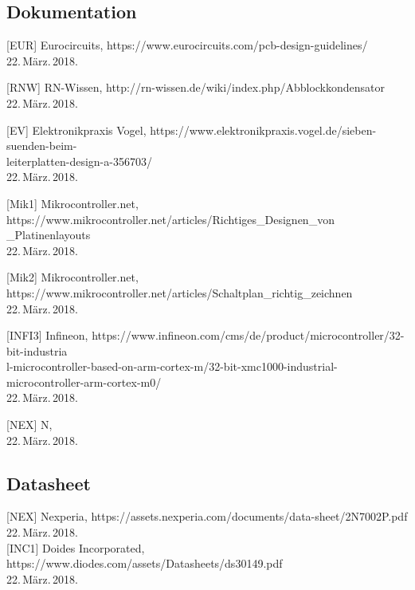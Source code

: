 \subsection{Dokumentation}

{ {[EUR] {Eurocircuits}}, {https://www.eurocircuits.com/pcb-design-guidelines/ }
\\ {22.\,März.\,2018}.\\

{ {[RNW] {RN-Wissen}}, {http://rn-wissen.de/wiki/index.php/Abblockkondensator }
\\ {22.\,März.\,2018}.\\

{ {[EV] {Elektronikpraxis Vogel}}, {https://www.elektronikpraxis.vogel.de/sieben-suenden-beim-\\leiterplatten-design-a-356703/ }
\\ {22.\,März.\,2018}.\\

{ {[Mik1] {Mikrocontroller.net}}, { https://www.mikrocontroller.net/articles/Richtiges\_Designen\_von\\
\_Platinenlayouts }
\\ {22.\,März.\,2018}.\\

{ {[Mik2] {Mikrocontroller.net}}, {https://www.mikrocontroller.net/articles/Schaltplan\_richtig\_zeichnen }
\\ {22.\,März.\,2018}.\\

{ {[INFI3] {Infineon}}, {https://www.infineon.com/cms/de/product/microcontroller/32-bit-industria\\
l-microcontroller-based-on-arm-cortex-m/32-bit-xmc1000-industrial-microcontroller-arm-cortex-m0/   }
\\ {22.\,März.\,2018}.\\

{ {[NEX] {N}}, {   }
\\ {22.\,März.\,2018}.\\

\subsection{Datasheet}

{ {[NEX] {Nexperia}}, {https://assets.nexperia.com/documents/data-sheet/2N7002P.pdf}
\\ {22.\,März.\,2018}.\\

{{[INC1] {Doides Incorporated}}, {https://www.diodes.com/assets/Datasheets/ds30149.pdf}
\\{22.\,März.\,2018}.\\

}}}}}}}}}
